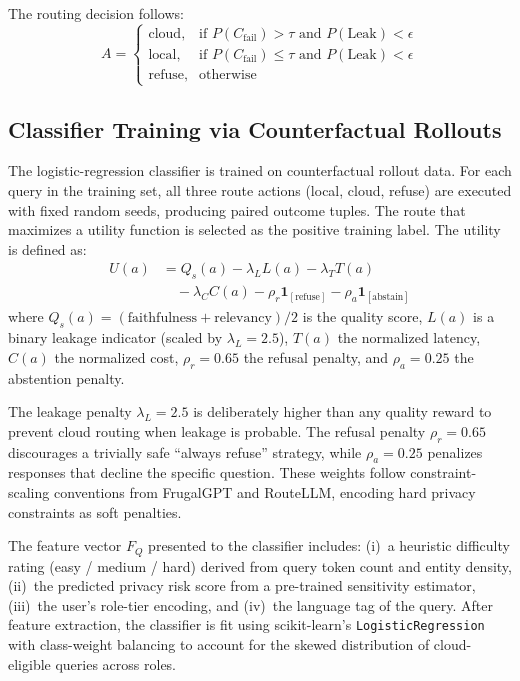 \documentclass{article}
\newcommand{\code}[1]{{\small\texttt{#1}}}
\begin{document}
The routing decision follows:
\begin{equation}
A = \begin{cases}
\text{cloud}, & \text{if } P(C_{\text{fail}}) > \tau \text{ and } P(\text{Leak}) < \epsilon \\
\text{local}, & \text{if } P(C_{\text{fail}}) \leq \tau \text{ and } P(\text{Leak}) < \epsilon \\
\text{refuse}, & \text{otherwise}
\end{cases}
\end{equation}

\subsection{Classifier Training via Counterfactual Rollouts}
The logistic-regression classifier is trained on counterfactual rollout data. For each query in the training set, all three route actions (local, cloud, refuse) are executed with fixed random seeds, producing paired outcome tuples. The route that maximizes a utility function is selected as the positive training label. The utility is defined as:
\begin{equation}
\begin{aligned}
U(a) &= Q_s(a) - \lambda_L L(a) - \lambda_T T(a) \\
     &\quad - \lambda_C C(a) - \rho_r \mathbf{1}_{[\text{refuse}]} - \rho_a \mathbf{1}_{[\text{abstain}]}
\end{aligned}
\end{equation}
where $Q_s(a) = (\text{faithfulness} + \text{relevancy})/2$ is the quality score, $L(a)$ is a binary leakage indicator (scaled by $\lambda_L = 2.5$), $T(a)$ the normalized latency, $C(a)$ the normalized cost, $\rho_r = 0.65$ the refusal penalty, and $\rho_a = 0.25$ the abstention penalty.

The leakage penalty $\lambda_L = 2.5$ is deliberately higher than any quality reward to prevent cloud routing when leakage is probable. The refusal penalty $\rho_r = 0.65$ discourages a trivially safe ``always refuse'' strategy, while $\rho_a = 0.25$ penalizes responses that decline the specific question. These weights follow constraint-scaling conventions from FrugalGPT and RouteLLM, encoding hard privacy constraints as soft penalties.

The feature vector $F_Q$ presented to the classifier includes: (i)~a heuristic difficulty rating (easy / medium / hard) derived from query token count and entity density, (ii)~the predicted privacy risk score from a pre-trained sensitivity estimator, (iii)~the user's role-tier encoding, and (iv)~the language tag of the query. After feature extraction, the classifier is fit using scikit-learn's \code{LogisticRegression} with class-weight balancing to account for the skewed distribution of cloud-eligible queries across roles.
\end{document}
